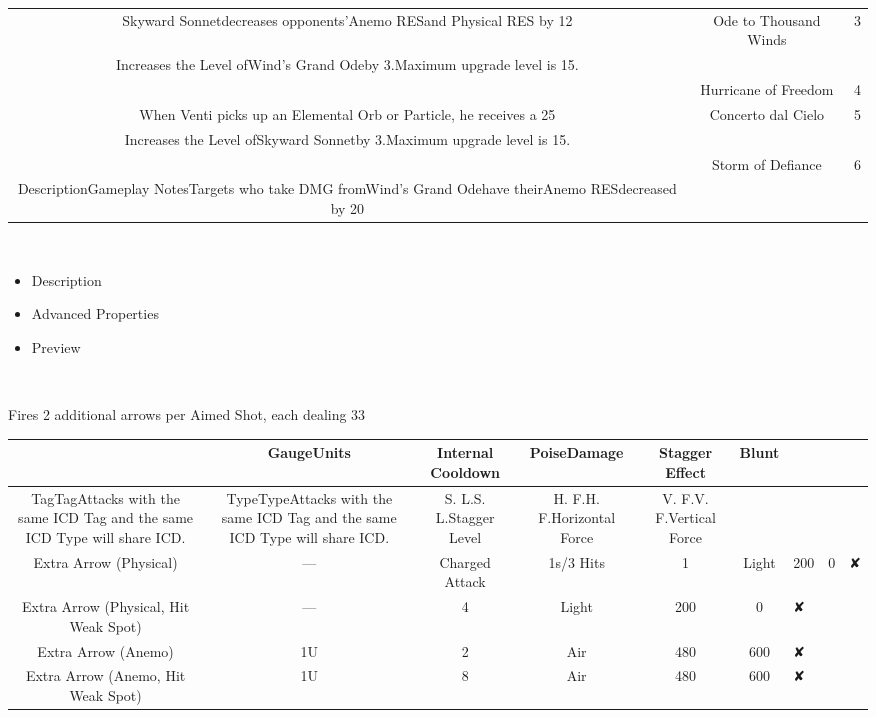 \documentclass[a4paper,12pt]{article}
\begin{document}
\begin{tabular}{|c|c|c|}
Skyward Sonnetdecreases opponents'Anemo RESand Physical RES by 12%
 & Ode to Thousand Winds & 3 \\
Increases the Level ofWind's Grand Odeby 3.Maximum upgrade level is 15. \\
 & Hurricane of Freedom & 4 \\
When Venti picks up an Elemental Orb or Particle, he receives a 25%
 & Concerto dal Cielo & 5 \\
Increases the Level ofSkyward Sonnetby 3.Maximum upgrade level is 15. \\
 & Storm of Defiance & 6 \\
DescriptionGameplay NotesTargets who take DMG fromWind's Grand Odehave theirAnemo RESdecreased by 20%
\end{tabular}\\ \par \vspace{0.5cm}

\begin{itemize}
\item Description
\item Advanced Properties
\item Preview
\end{itemize}\\ \par \vspace{0.5cm}

Fires 2 additional arrows per Aimed Shot, each dealing 33%

\begin{tabular}{|c|c|c|c|c|c|} \hline
 & GaugeUnits & Internal Cooldown & PoiseDamage & Stagger Effect & Blunt \\
 \hline
TagTagAttacks with the same ICD Tag and the same ICD Type will share ICD. & TypeTypeAttacks with the same ICD Tag and the same ICD Type will share ICD. & S. L.S. L.Stagger Level & H. F.H. F.Horizontal Force & V. F.V. F.Vertical Force \\
Extra Arrow (Physical) & — & Charged Attack & 1s/3 Hits & 1 & Light & 200 & 0 & ✘ \\
Extra Arrow (Physical, Hit Weak Spot) & — & 4 & Light & 200 & 0 & ✘ \\
Extra Arrow (Anemo) & 1U & 2 & Air & 480 & 600 & ✘ \\
Extra Arrow (Anemo, Hit Weak Spot) & 1U & 8 & Air & 480 & 600 & ✘ \\
\end{tabular}\\ \par \vspace{0.5cm}
\end{document}
